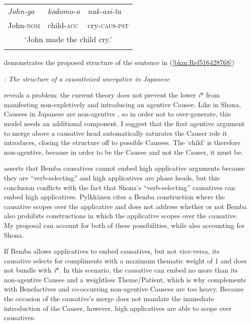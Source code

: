 \documentclass[output=paper,modfonts,nonflat]{langsci/langscibook}
\begin{document}
\tablefirsthead{}

\tabletail{}
\tablelasttail{}
\begin{tabularx}{\textwidth}{XXX}
\lsptoprule
\textit{John-ga} & \textit{kodomo-o} & \textit{nak-asi-ta}\\
John-\textsc{nom} & child-\textsc{acc} & cry-\textsc{caus-pst}\\
\multicolumn{3}{c}{‘John made the child cry.’}\\
\lspbottomrule
\end{tabularx}

 demonstrates the proposed structure of the sentence in (\ref{bkm:Ref516428768})



    
 



\textit{: The structure of a causativized unergative in Japanese}



 reveals a problem: the current theory does not prevent the lower \textit{i}* from manifesting non-expletively and introducing an agentive Causee. Like in Shona, Causees in Japanese are non-agentive \citep[107]{Pylkkänen2008}, so in order not to over-generate, this model needs an additional component. I suggest that the first agentive argument to merge above a causative head automatically saturates the Causer role it introduces, closing the structure off to possible Causees. The ‘child’ is therefore non-agentive, because in order to be the Causee and not the Causer, it must be. 



\citet{Pylkkänen2008} asserts that Bemba causatives cannot embed high applicative arguments because they are “verb-selecting” and high applicatives are phase heads, but this conclusion conflicts with the fact that Shona’s “verb-selecting” causatives can embed high applicatives. Pylkkänen cites a Bemba construction where the causative scopes over the applicative and does not address whether or not Bemba also prohibits constructions in which the applicative scopes over the causative. My proposal can account for both of these possibilities, while also accounting for Shona. 



If Bemba allows applicatives to embed causatives, but not vice-versa, its causative selects for compliments with a maximum thematic weight of 1 and does not bundle with \textit{i}*. In this scenario, the causative can embed no more than its non-agentive Causee and a weightless Theme/Patient, which is why complements with Benefactives and co-occurring non-agentive Causees are too heavy. Because the occasion of the causative’s merge does not mandate the immediate introduction of the Causer, however, high applicatives are able to scope over causatives. 
\end{document}
